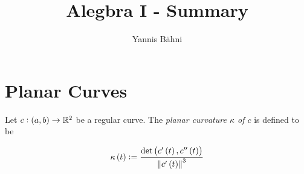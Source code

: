 


\title{Alegbra I - Summary}
\author{Yannis B\"{a}hni}
\address[Yannis B\"{a}hni]{University of Zurich, R\"{a}mistrasse 71, 8006 Zurich}

\maketitle
\thispagestyle{fancy}

\tableofcontents

\originalsectionstyle

\section{Planar Curves}

\begin{definition}
	Let $c: \intoo{a,b} \to \mathbb{R}^2$ be a regular curve. The \emph{planar curvature $\kappa$ of $c$} is defined to be

	\begin{equation}
		\kappa\del{t} := \frac{\det\del{c'\del{t},c''\del{t}}}{\norm[0]{c'\del{t}}^3}	
	\end{equation}
\end{definition}



